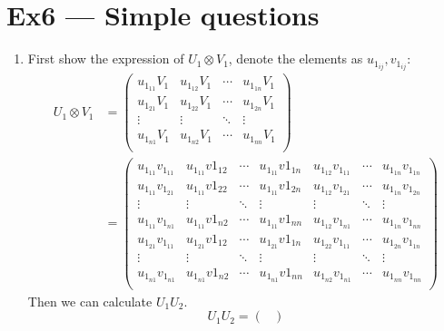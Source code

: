 \documentclass[12pt, a4paper]{article}
\begin{document}
\section*{Ex6 --- Simple questions}
\begin{enumerate}
    \item First show the expression of $U_1\otimes V_1$, denote the elements as $u_{1_{ij}}, v_{1_{ij}}$:
          \begin{align*}
            U_1 \otimes V_1 &= 
            \begin{pmatrix}
                u_{1_{11}}V_1 & u_{1_{12}}V_1 & \cdots & u_{1_{1n}}V_1\\
                u_{1_{21}}V_1 & u_{1_{22}}V_1 & \cdots & u_{1_{2n}}V_1\\
                \vdots & \vdots & \ddots & \vdots\\
                u_{1_{n1}}V_1 & u_{1_{n2}}V_1 & \cdots & u_{1_{nn}}V_1\\
            \end{pmatrix}\\
            &= \begin{pmatrix}
                u_{1_{11}}v_{1_{11}} & u_{1_{11}}v{1_{12}} & \cdots & u_{1_{11}}v{1_{1n}} & u_{1_{12}}v_{1_{11}} & \cdots & u_{1_{1n}}v_{1_{1n}}\\
                u_{1_{11}}v_{1_{21}} & u_{1_{11}}v{1_{22}} & \cdots & u_{1_{11}}v{1_{2n}} & u_{1_{12}}v_{1_{21}} & \cdots & u_{1_{1n}}v_{1_{2n}}\\
                \vdots & \vdots & \ddots & \vdots & \vdots & \ddots & \vdots\\
                u_{1_{11}}v_{1_{n1}} & u_{1_{11}}v{1_{n2}} & \cdots & u_{1_{11}}v{1_{nn}} & u_{1_{12}}v_{1_{n1}} & \cdots & u_{1_{1n}}v_{1_{nn}}\\
                u_{1_{21}}v_{1_{11}} & u_{1_{21}}v{1_{12}} & \cdots & u_{1_{21}}v{1_{1n}} & u_{1_{22}}v_{1_{11}} & \cdots & u_{1_{2n}}v_{1_{1n}}\\
                \vdots & \vdots & \ddots & \vdots & \vdots & \ddots & \vdots\\
                u_{1_{n1}}v_{1_{n1}} & u_{1_{n1}}v{1_{n2}} & \cdots & u_{1_{n1}}v{1_{nn}} & u_{1_{n2}}v_{1_{n1}} & \cdots & u_{1_{nn}}v_{1_{nn}}\\
            \end{pmatrix}
          \end{align*}
          Then we can calculate $U_1U_2$.
          $$U_1U_2 = 
          \begin{pmatrix}

\end{pmatrix}$$
\end{enumerate}
\end{document}
